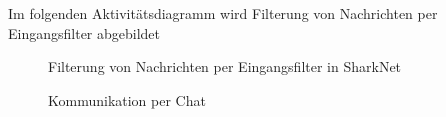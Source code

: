 \documentclass[german, 12pt]{book}
\begin{document}
Im folgenden Aktivitätsdiagramm wird Filterung von Nachrichten per Eingangsfilter abgebildet
\begin{figure}[H]
	\centering
	\hspace*{1cm}
	\caption{Filterung von Nachrichten per Eingangsfilter in SharkNet}
	\label{fig:entryFilter}
\end{figure}

\newpage

\begin{figure}[H]
	\centering
	\hspace*{1cm}
	\caption{Kommunikation per Chat}
	\label{fig:communication}
\end{figure}

\newpage
\end{document}
